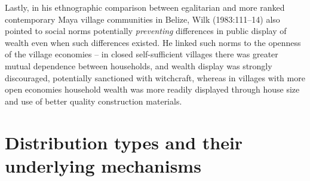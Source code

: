 \documentclass[
  12pt,
]{book}
\begin{document}
Lastly, in his ethnographic comparison between egalitarian and more ranked contemporary Maya village communities in Belize, Wilk (1983:111--14) also pointed to social norms potentially \emph{preventing} differences in public display of wealth even when such differences existed. He linked such norms to the openness of the village economies -- in closed self-sufficient villages there was greater mutual dependence between households, and wealth display was strongly discouraged, potentially sanctioned with witchcraft, whereas in villages with more open economies household wealth was more readily displayed through house size and use of better quality construction materials.

\hypertarget{distributions}{%
\section{Distribution types and their underlying mechanisms}\label{distributions}}
\end{document}
